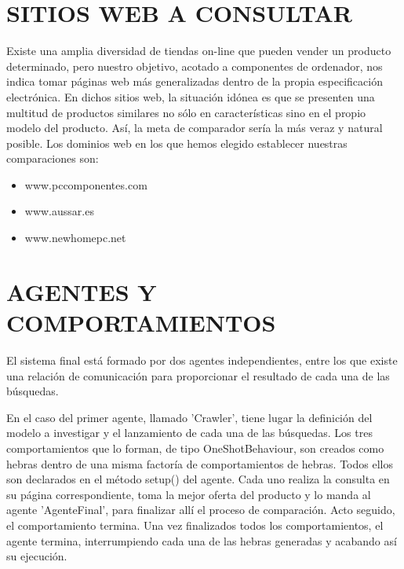 \documentclass{pre-tfg}
\begin{document}
\section{SITIOS WEB A CONSULTAR}
Existe una amplia diversidad de tiendas on-line que pueden vender un producto determinado, pero nuestro objetivo, acotado a componentes de ordenador, nos indica tomar páginas web más generalizadas dentro de la propia especificación electrónica. En dichos sitios web, la situación idónea es que se presenten una multitud de productos similares no sólo en características sino en el propio modelo del producto. Así, la meta de comparador sería la más  veraz y natural posible. Los dominios web en los que hemos elegido establecer nuestras comparaciones son:
\begin{itemize}
 	\item www.pccomponentes.com
	\item www.aussar.es
	\item www.newhomepc.net
\end{itemize}

\section{AGENTES Y COMPORTAMIENTOS}
El sistema final está formado por dos agentes independientes, entre los que existe una relación de comunicación para proporcionar el resultado de cada una de las búsquedas.

En el caso del primer agente, llamado 'Crawler', tiene lugar la definición del modelo a investigar y el lanzamiento de cada una de las búsquedas. Los tres comportamientos que lo forman, de tipo OneShotBehaviour, son creados como hebras dentro de una misma factoría de comportamientos de hebras. Todos ellos son declarados en el método setup() del agente. Cada uno realiza la consulta en su página correspondiente, toma la mejor oferta del producto y lo manda al agente 'AgenteFinal', para finalizar allí el proceso de comparación. Acto seguido, el comportamiento termina. Una vez finalizados todos los comportamientos, el agente termina, interrumpiendo cada una de las hebras generadas y acabando así su ejecución.
\end{document}
